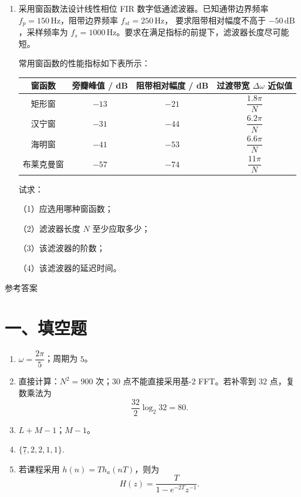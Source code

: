\documentclass[UTF8,a4paper,12pt]{ctexart}
\begin{document}
\begin{enumerate}[label={}, leftmargin=2em, itemsep=1.6em]

\item 采用窗函数法设计线性相位 FIR 数字低通滤波器。已知通带边界频率
$f_p=150\,\mathrm{Hz}$，阻带边界频率 $f_{st}=250\,\mathrm{Hz}$，
要求阻带相对幅度不高于 $-50\,\mathrm{dB}$，采样频率为
$f_s=1000\,\mathrm{Hz}$。要求在满足指标的前提下，滤波器长度尽可能短。

常用窗函数的性能指标如下表所示：

\begin{center}
\setlength{\tabcolsep}{10pt}
\renewcommand{\arraystretch}{1.7}
\begin{tabular}{c|c|c|c}
\hline
窗函数 & 旁瓣峰值 / dB & 阻带相对幅度 / dB & 过渡带宽 $\Delta\omega$ 近似值 \\
\hline
矩形窗 & $-13$ & $-21$ & $\dfrac{1.8\pi}{N}$ \\
汉宁窗 & $-31$ & $-44$ & $\dfrac{6.2\pi}{N}$ \\
海明窗 & $-41$ & $-53$ & $\dfrac{6.6\pi}{N}$ \\
布莱克曼窗 & $-57$ & $-74$ & $\dfrac{11\pi}{N}$ \\
\hline
\end{tabular}
\end{center}

试求：

（1）应选用哪种窗函数；

（2）滤波器长度 $N$ 至少应取多少；

（3）该滤波器的阶数；

（4）该滤波器的延迟时间。

\newpage


\end{enumerate}




\newpage
\pagestyle{empty}%

\begin{center}
{\heiti{} 参考答案}
\end{center}

\vspace{1em}

\begingroup
\small
\setlength{\parskip}{0.25em}

\section*{一、填空题}

\begin{enumerate}[label=\arabic*., leftmargin=2em]
\item $\omega=\dfrac{2\pi}{5}$；周期为 $5$。
\item 直接计算：$N^2 = 900$ 次；$30$ 点不能直接采用基-$2$ FFT。若补零到 $32$ 点，复数乘法为
\[
\frac{32}{2}\log_2 32=80.
\]
\item $L+M-1$；$M-1$。
\item $\{\underline{7},2,2,1,1\}$.
\item 
若课程采用 $h(n)=T h_a(nT)$，则为
\[
H(z)=\frac{T}{1-e^{-2T}z^{-1}}.
\]
\end{enumerate}
\end{document}

